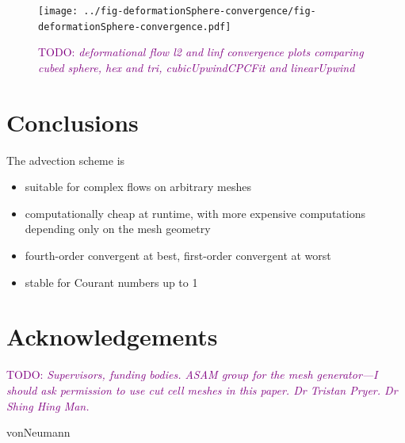 \documentclass{article}
\newcommand{\TODO}[1]{\textcolor{purple}{TODO: \emph{#1}}}
\begin{document}
\begin{figure}
	\texttt{[image: ../fig-deformationSphere-convergence/fig-deformationSphere-convergence.pdf]}
	\caption{\TODO{deformational flow l2 and linf convergence plots comparing cubed sphere, hex and tri, cubicUpwindCPCFit and linearUpwind}}
\end{figure}


\section{Conclusions}

The advection scheme is
\begin{itemize}
	\item suitable for complex flows on arbitrary meshes
	\item computationally cheap at runtime, with more expensive computations depending only on the mesh geometry
	\item fourth-order convergent at best, first-order convergent at worst
	\item stable for Courant numbers up to 1
\end{itemize}

\section{Acknowledgements}
\TODO{Supervisors, funding bodies.  ASAM group for the mesh generator---I should ask permission to use cut cell meshes in this paper.  Dr Tristan Pryer.  Dr Shing Hing Man.}






 {vonNeumann}
\end{document}
